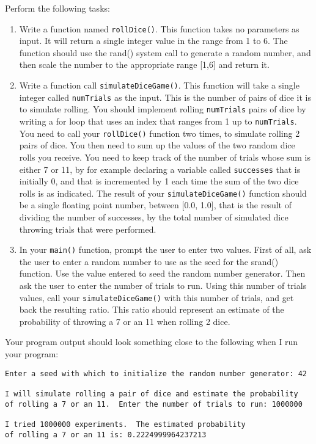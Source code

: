 \documentclass[11pt]{article}
\begin{document}
Perform the following tasks:

\begin{enumerate}
\item Write a function named \verb~rollDice()~.  This function takes no
parameters as input.  It will return a single integer value in the
range from 1 to 6.  The function should use the rand()
system call to generate a random number, and then scale the
number to the appropriate range [1,6] and return it.

\item Write a function call \verb~simulateDiceGame()~.  This function will
take a single integer called \verb~numTrials~ as the input.  This is the
number of pairs of dice it is to simulate rolling.  You should
implement rolling \verb~numTrials~ pairs of dice by writing a for loop
that uses an index that ranges from 1 up to \verb~numTrials~.  You need
to call your \verb~rollDice()~ function two times, to simulate rolling 2
pairs of dice.  You then need to sum up the values of the two
random dice rolls you receive.  You need to keep track of the
number of trials whose sum is either 7 or 11, by for example
declaring a variable called \verb~successes~ that is initially 0, and
that is incremented by 1 each time the sum of the two dice rolls is
as indicated.  The result of your \verb~simulateDiceGame()~ function should
be a single floating point number, between [0.0, 1.0], that is the
result of dividing the number of successes, by the total number of
simulated dice throwing trials that were performed.

\item In your \verb~main()~ function, prompt the user to enter two values.
First of all, ask the user to enter a random number to use as the
seed for the srand() function.  Use the value entered to seed the
random number generator.  Then ask the user to enter the number of
trials to run. Using this number of trials values, call your
\verb~simulateDiceGame()~ with this number of trials, and get back the
resulting ratio.  This ratio should represent an estimate of the
probability of throwing a 7 or an 11 when rolling 2 dice.
\end{enumerate}

Your program output should look something close to the following when I
run your program:

\begin{verbatim}
Enter a seed with which to initialize the random number generator: 42

I will simulate rolling a pair of dice and estimate the probability
of rolling a 7 or an 11.  Enter the number of trials to run: 1000000

I tried 1000000 experiments.  The estimated probability
of rolling a 7 or an 11 is: 0.2224999964237213
\end{verbatim}
\end{document}
